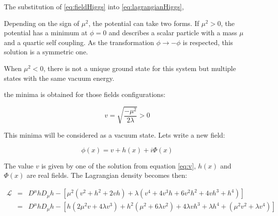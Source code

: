     The substitution of \ref{eq:fieldHiggs} into \ref{eq:lagrangianHiggs}, 

%
    
    
    Depending on the sign of $\mu^{2}$, the potential can take two forms.
    If $\mu^{2} > 0$, the potential has a minimum at $\phi = 0$ and describes a scalar particle with a mass $\mu$ and a quartic self coupling.
    As the transformation $\phi \rightarrow  - \phi$ is respected, this solution is a symmetric one.

    When $\mu^{2} < 0$, there is not a unique ground state for this system but multiple states with the same vacuum energy.
    
    the minima is obtained for those fields configurations:

    \begin{equation}
      v = \sqrt{\frac{- \mu^2}{2\lambda}} > 0
      \label{eq:v}
    \end{equation}

    This minima will be considered as a vacuum state.
    Lets write a new field:

    \begin{equation}
      \phi(x) = v + h(x) + i \Phi(x)
      \label{eq:fieldHiggs}
    \end{equation}

    The value $v$ is given by one of the solution from equation \ref{eq:v}, $h(x)$ and $\Phi(x)$ are real fields.
    The Lagrangian density becomes then: 

    \begin{equation}
    \begin{array}{rcl}
        \mathcal{L} & = & D^{\mu}h D_{\mu}h - \left[ \mu^2\left(v^2 + h^2 + 2vh\right) + \lambda \left(v^4 + 4v^3h + 6v^2h^2 + 4vh^3 + h^4\right)\right] \\
                    & = & D^{\mu}h D_{\mu}h - \left[ h \left( 2\mu^2v + 4\lambda v^3 \right) + h^2 \left(\mu^2 + 6 \lambda v^2 \right) + 4 \lambda v h^3 + \lambda h^4 + \left( \mu^2v^2 + \lambda v^4 \right) \right]
      \end{array}
    \end{equation}

